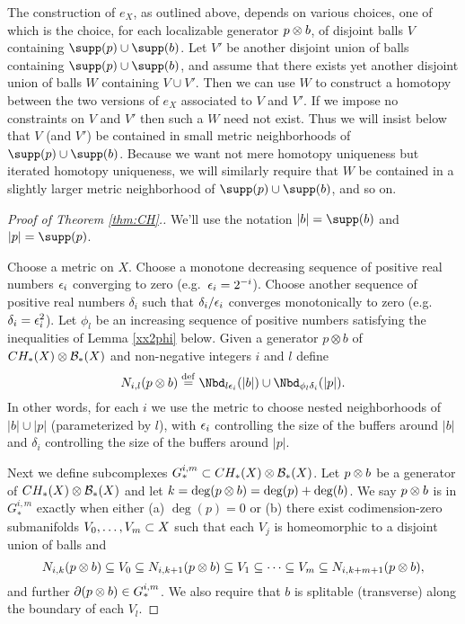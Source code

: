 {The construction of $e_X$, as outlined above, depends on various choices, one of which 
is the choice, for each localizable generator $p\otimes b$, 
of disjoint balls $V$ containing $\supp(p)\cup\supp(b)$.
Let $V'$ be another disjoint union of balls containing $\supp(p)\cup\supp(b)$,
and assume that there exists yet another disjoint union of balls $W$ containing 
$V\cup V'$.
Then we can use $W$ to construct a homotopy between the two versions of $e_X$ 
associated to $V$ and $V'$.
If we impose no constraints on $V$ and $V'$ then such a $W$ need not exist.
Thus we will insist below that $V$ (and $V'$) be contained in small metric neighborhoods
of $\supp(p)\cup\supp(b)$.
Because we want not mere homotopy uniqueness but iterated homotopy uniqueness,
we will similarly require that $W$ be contained in a slightly larger metric neighborhood of 
$\supp(p)\cup\supp(b)$, and so on.


\begin{proof}[Proof of Theorem \ref{thm:CH}.]
We'll use the notation $|b| = \supp(b)$ and $|p| = \supp(p)$.

Choose a metric on $X$.
Choose a monotone decreasing sequence of positive real numbers $\epsilon_i$ converging to zero
(e.g.\ $\epsilon_i = 2^{-i}$).
Choose another sequence of positive real numbers $\delta_i$ such that $\delta_i/\epsilon_i$
converges monotonically to zero (e.g.\ $\delta_i = \epsilon_i^2$).
Let $\phi_l$ be an increasing sequence of positive numbers
satisfying the inequalities of Lemma \ref{xx2phi} below.
Given a generator $p\otimes b$ of $CH_*(X)\otimes {\mathcal B}_*(X)$ and non-negative integers $i$ and $l$
define
\[
	N_{i,l}(p\ot b) \deq \Nbd_{l\ep_i}(|b|) \cup \Nbd_{\phi_l\delta_i}(|p|).
\]
In other words, for each $i$
we use the metric to choose nested neighborhoods of $|b|\cup |p|$ (parameterized
by $l$), with $\epsilon_i$ controlling the size of the buffers around $|b|$ and $\delta_i$ controlling
the size of the buffers around $|p|$.

Next we define subcomplexes $G_*^{i,m} \subset CH_*(X)\otimes {\mathcal B}_*(X)$.
Let $p\otimes b$ be a generator of $CH_*(X)\otimes {\mathcal B}_*(X)$ and let $k = \deg(p\otimes b)
= \deg(p) + \deg(b)$.
We say $p\otimes b$ is in $G_*^{i,m}$ exactly when either (a) $\deg(p) = 0$ or (b)
there exist codimension-zero submanifolds $V_0,\ldots,V_m \subset X$ such that each $V_j$
is homeomorphic to a disjoint union of balls and
\[
	N_{i,k}(p\otimes b) \subseteq V_0 \subseteq N_{i,k+1}(p\otimes b)
			\subseteq V_1 \subseteq \cdots \subseteq V_m \subseteq N_{i,k+m+1}(p\otimes b) ,
\]
and further $\partial(p\otimes b) \in G_*^{i,m}$.
We also require that $b$ is splitable (transverse) along the boundary of each $V_l$.


\end{proof}}
